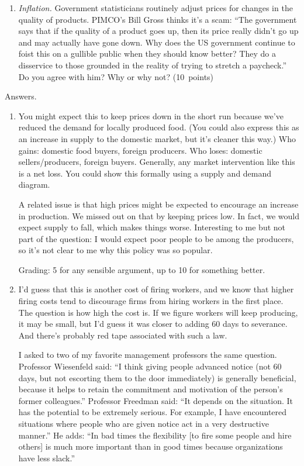 \documentclass[letterpaper,12pt]{article}
\begin{document}
\begin{enumerate}
\begin{enumerate}
\item {\it Inflation.\/} 
Government statisticians routinely adjust prices for changes 
in the quality of products.
PIMCO's Bill Gross thinks it's a scam:
``The government says that if the quality of a product goes up, 
then its price really didn't go up and may actually have gone down.  
Why does the US government continue to foist this on a gullible public when they should know better?  They do a disservice to those grounded in the reality of trying to stretch a paycheck.''
Do you agree with him?  Why or why not?  
(10~points)
\end{enumerate}


\pagebreak 
Answers.  
\begin{enumerate}
%
\item You might expect this to keep prices down in the short run 
because we've reduced the demand for locally produced food.
(You could also express this as an increase in supply to the domestic market, but it's cleaner this way.) 
Who gains:  domestic food buyers, foreign producers.
Who loses:  domestic sellers/producers, foreign buyers.  
Generally, any market intervention like this is a net loss. 
You could show this formally using a supply and demand diagram.  

A related issue is that high prices might be expected to encourage 
an increase in production.
We missed out on that by keeping prices low.  
In fact, we would expect supply to fall, which makes things worse.  
Interesting to me but not part of the question:  
I would expect poor people to be among the producers, so it's not clear to me why this policy was so popular.   

Grading:  5 for any sensible argument, 
up to 10 for something better. 

\item  I'd guess that this is another cost of firing workers, 
and we know that higher firing costs tend to discourage firms
from hiring workers in the first place.  
The question is how high the cost is.  
If we figure workers will keep producing, it may be small, 
but I'd guess it was closer to adding 60 days to severance.  
And there's probably red tape associated with such a law.  

I asked to two of my favorite management professors 
the same question.
Professor Wiesenfeld said:  
``I think giving people advanced notice (not 60 days, but not escorting them to the door immediately) is generally beneficial, 
because it helps to retain the commitment and motivation of the person's former colleagues.''
Professor Freedman said:  
``It depends on the situation.  It has the potential to be extremely serious. For example, I have encountered situations where people who are given notice act in a very destructive manner.''
He adds:  
``In bad times the flexibility [to fire some people and hire others] 
is much more important than in good times because organizations have less slack.''


\end{enumerate}
\end{enumerate}
\end{document}
